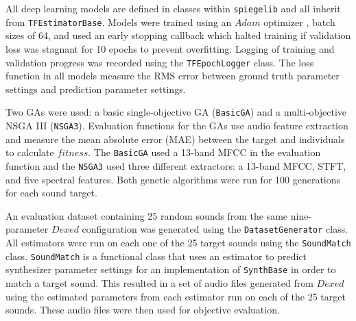 All deep learning models are defined in classes within \texttt{spiegelib} and all inherit from \texttt{TFEstimatorBase}. Models were trained using an $Adam$ optimizer \cite{kingma2014adam}, batch sizes of 64, and used an early stopping callback which halted training if validation loss was stagnant for 10 epochs to prevent overfitting. Logging of training and validation progress was recorded using the \texttt{TFEpochLogger} class. The loss function in all models measure the RMS error between ground truth parameter settings and prediction parameter settings. 


Two GAs were used: a basic single-objective GA (\texttt{BasicGA}) and a multi-objective NSGA III (\texttt{NSGA3}). Evaluation functions for the GAs use audio feature extraction and measure the mean absolute error (MAE) between the target and individuals to calculate $fitness$. The \texttt{BasicGA} used a 13-band MFCC in the evaluation function and the \texttt{NSGA3} used three different extractors: a 13-band MFCC, STFT, and five spectral features. Both genetic algorithms were run for 100 generations for each sound target.


An evaluation dataset containing 25 random sounds from the same nine-parameter $Dexed$ configuration was generated using the \texttt{DatasetGenerator} class. All estimators were run on each one of the 25 target sounds using the \texttt{SoundMatch} class. \texttt{SoundMatch} is a functional class that uses an estimator to predict synthesizer parameter settings for an implementation of \texttt{SynthBase} in order to match a target sound. This resulted in a set of audio files generated from $Dexed$ using the estimated parameters from each estimator run on each of the 25 target sounds. These audio files were then used for objective evaluation.

